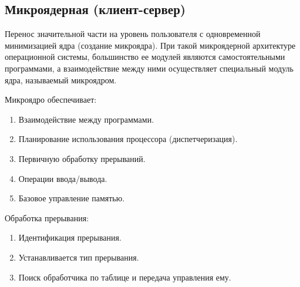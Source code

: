 \subsection{Микроядерная (клиент-сервер)}
Перенос значительной части на уровень пользователя с одновременной минимизацией
ядра (создание микроядра). При такой микроядерной архитектуре операционной
системы, большинство ее модулей являются самостоятельными программами, а
взаимодействие между ними осуществляет специальный модуль ядра, называемый
микроядром.\par
Микроядро обеспечивает:
\begin{enumerate}
  \item Взаимодействие между программами.
  \item Планирование использования процессора (диспетчеризация).
  \item Первичную обработку прерываний.
  \item Операции ввода/вывода.
  \item Базовое управление памятью.
\end{enumerate}
Обработка прерывания:
\begin{enumerate}
  \item Идентификация прерывания.
  \item Устанавливается тип прерывания.
  \item Поиск обработчика по таблице и передача управления ему.
\end{enumerate}
